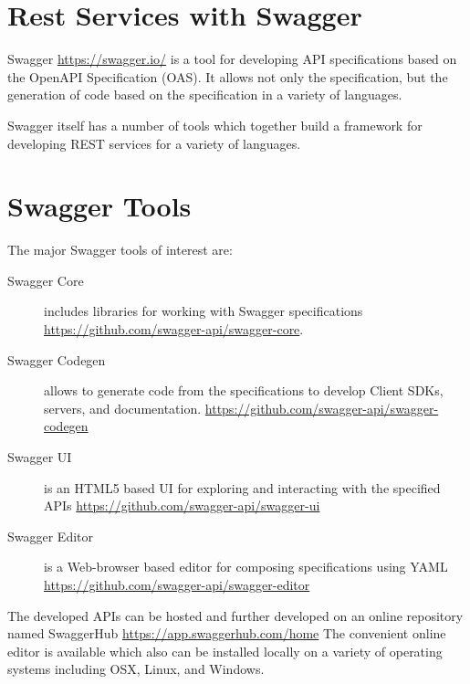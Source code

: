 

\section{Rest Services with Swagger}

Swagger \url{https://swagger.io/} is a tool for developing API
specifications based on the OpenAPI Specification (OAS). It allows not
only the specification, but the generation of code based on the
specification in a variety of languages.

Swagger itself has a number of tools which together build a framework
for developing REST services for a variety of languages.


\section{Swagger Tools}

The major Swagger tools of interest are:

\begin{description}

\item[Swagger Core] includes libraries for working with Swagger
 specifications \url{https://github.com/swagger-api/swagger-core}.

\item[Swagger Codegen] allows to generate code from the specifications
 to develop Client SDKs, servers, and documentation. \url{https://github.com/swagger-api/swagger-codegen}

\item[Swagger UI] is an HTML5 based UI for exploring and interacting
 with the specified APIs \url{https://github.com/swagger-api/swagger-ui}

\item[Swagger Editor] is a Web-browser based editor for composing 
 specifications using YAML \url{https://github.com/swagger-api/swagger-editor}

\end{description}

The developed APIs can be hosted and further developed on an
online repository named SwaggerHub \url{https://app.swaggerhub.com/home}
The convenient online editor is available which also can be installed
locally on a variety of operating systems including OSX, Linux, and
Windows. 


